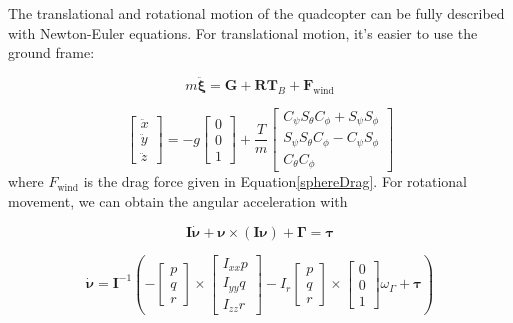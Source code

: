 The translational and rotational motion of the quadcopter can be fully described with Newton-Euler equations. For translational motion, it's easier to use the ground frame: 

\begin{equation}
\label{translationEquation}
m \ddot{\boldsymbol{\xi}}=\boldsymbol{G}+\boldsymbol{R} \boldsymbol{T}_{B} + \boldsymbol{F}_{\text{wind}}
\end{equation}

\begin{equation}
\left[\begin{array}{c}
\ddot{x} \\
\ddot{y} \\
\ddot{z}
\end{array}\right]=-g\left[\begin{array}{c}
0 \\
0 \\
1
\end{array}\right]+\frac{T}{m}\left[\begin{array}{c}
C_{\psi} S_{\theta} C_{\phi}+S_{\psi} S_{\phi} \\
S_{\psi} S_{\theta} C_{\phi}-C_{\psi} S_{\phi} \\
C_{\theta} C_{\phi}
\end{array}\right]
\end{equation}
where $F_{\text{wind}}$ is the drag force given in Equation\ref{sphereDrag}.
For rotational movement, we can obtain the angular acceleration with

\begin{equation}
\boldsymbol{I} \dot{\boldsymbol{\nu}}+\boldsymbol{\nu} \times(\boldsymbol{I} \boldsymbol{\nu})+\boldsymbol{\Gamma}=\boldsymbol{\tau}
\end{equation}

\begin{equation}
\label{angularEquation}
\dot{\boldsymbol{\nu}}=\boldsymbol{I}^{-1}\left(-\left[\begin{array}{c}
p \\
q \\
r
\end{array}\right] \times\left[\begin{array}{c}
I_{x x} p \\
I_{y y} q \\
I_{z z} r
\end{array}\right]-I_{r}\left[\begin{array}{c}
p \\
q \\
r
\end{array}\right] \times\left[\begin{array}{l}
0 \\
0 \\
1
\end{array}\right] \omega_{\Gamma}+\boldsymbol{\tau}\right)
\end{equation}

